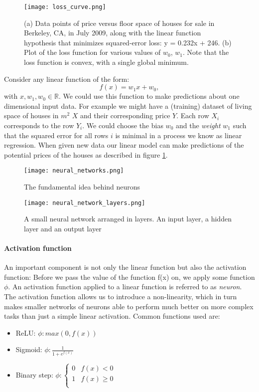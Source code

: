 \begin{figure}
    \centering
    \texttt{[image: loss\_curve.png]}
    \caption{(a) Data points of price versus floor space of houses for sale in Berkeley, CA, in July 2009, along with the linear function hypothesis that minimizes squared-error loss: y = 0.232x + 246. (b) Plot of the loss function for various values of $ w_0 $, $ w_1 $. Note that the loss function is convex, with a single global minimum. \cite[p. 1251]{russell_artificial_2021}}
    \label{loss_curve}
\end{figure}

Consider any linear function of the form:
$$
    f(x) = w_1x + w_0,
$$
with $ x, w_1, w_0 \in \mathbb{R} $. We could use this function to make predictions about one dimensional input data. For example we might have a (training) dataset of living space of houses in $ m^2 $ $ X $ and their corresponding price $ Y $. Each row $X_i$ corresponds to the row $Y_i$. We could choose the bias $ w_0 $ and the \textit{weight} $ w_1 $ such that the squared error for all rows $i$ is minimal in a process we know as linear regression. When given new data our linear model can make predictions of the potential prices of the houses as described in figure \ref{loss_curve}.


\begin{figure}
    \centering
    \texttt{[image: neural\_networks.png]}
    \caption{The fundamental idea behind neurons}
    \label{neural_network}
\end{figure}

\begin{figure}
    \centering
    \texttt{[image: neural\_network\_layers.png]}
    \caption{A small neural network arranged in layers. An input layer, a hidden layer and an output layer}
    \label{neural_network_layers}
\end{figure}

\paragraph{Activation function}
An important component is not only the linear function but also the activation function: Before we pass the value of the function f(x) on, we apply some function $ \phi $. An activation function applied to a linear function is referred to as \textit{neuron}. The activation function allows us to introduce a non-linearity, which in turn makes smaller networks of neurons able to perform much better on more complex tasks than just a simple linear activation. Common functions used are:
\begin{itemize}
    \item ReLU: $ \phi : max(0, f(x)) $
    \item Sigmoid: $ \phi : \frac{1}{1 + e^{f(x)}} $
    \item Binary step: $ \phi : \begin{cases}
                  0 & f(x) < 0    \\
                  1 & f(x) \geq 0 \\
              \end{cases}$
\end{itemize}


